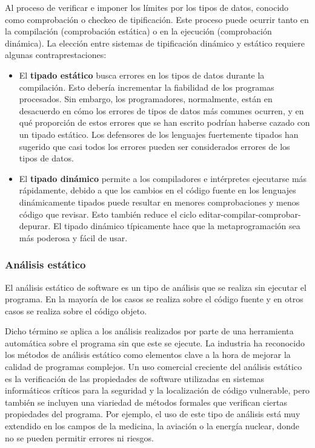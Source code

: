 Al proceso de verificar e imponer los l\'imites por los tipos de datos, conocido como comprobaci\'on o checkeo de tipificaci\'on. Este proceso puede ocurrir tanto en la compilaci\'on (comprobaci\'on est\'atica) o en la ejecuci\'on (comprobaci\'on din\'amica). La elecci\'on entre sistemas de tipificaci\'on din\'amico y est\'atico requiere algunas contraprestaciones:

\begin{itemize}
\item El \textbf{tipado est\'atico} busca errores en los tipos de datos durante la compilaci\'on. Esto deber\'ia incrementar la fiabilidad de los programas procesados. Sin embargo, los programadores, normalmente, est\'an en desacuerdo en c\'omo los errores de tipos de datos m\'as comunes ocurren, y en qu\'e proporci\'on de estos errores que se han escrito podr\'ian haberse cazado con un tipado est\'atico.  Los defensores de los lenguajes fuertemente tipados han sugerido que casi todos los errores pueden ser considerados errores de los tipos de datos.
\item El \textbf{tipado din\'amico} permite a los compiladores e int\'erpretes ejecutarse m\'as r\'apidamente, debido a que los cambios en el c\'odigo fuente en los lenguajes din\'amicamente tipados puede resultar en menores comprobaciones y menos c\'odigo que revisar. Esto tambi\'en reduce el ciclo editar-compilar-comprobar-depurar. El tipado din\'amico t\'ipicamente hace que la metaprogramaci\'on sea m\'as poderosa y f\'acil de usar.
\end{itemize}


\subsubsection*{An\'alisis est\'atico}

El an\'alisis est\'atico de software es un tipo de an\'alisis que se realiza sin ejecutar el programa. En la mayor\'ia de los casos se realiza sobre el c\'odigo fuente y en otros casos se realiza sobre el c\'odigo objeto.

Dicho t\'ermino se aplica a los an\'alisis realizados por parte de una herramienta autom\'atica sobre el programa sin que este se ejecute. La industria ha reconocido los m\'etodos de an\'alisis est\'atico como elementos clave a la hora de mejorar la calidad de programas complejos. Un uso comercial creciente del an\'alisis est\'atico es la verificaci\'on de las propiedades de software utilizadas en sistemas inform\'aticos cr\'iticos para la seguridad y la localizaci\'on de c\'odigo vulnerable, pero tambi\'en se incluyen una viariedad de m\'etodos formales que verifican ciertas propiedades del programa. Por ejemplo, el uso de este tipo de an\'alisis est\'a muy extendido en los campos de la medicina, la aviaci\'on o la energ\'ia nuclear, donde no se pueden permitir errores ni riesgos.


